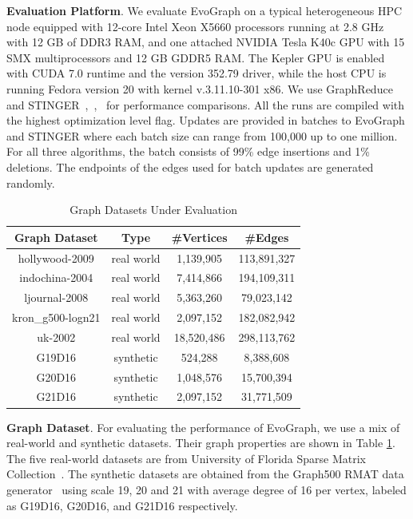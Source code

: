 \textbf{Evaluation Platform}. We evaluate EvoGraph on a typical heterogeneous HPC node equipped with 12-core Intel Xeon  X5660 processors running at 2.8 GHz with 12 GB of DDR3 RAM, and one attached NVIDIA Tesla K40c GPU with 15 SMX multiprocessors and 12 GB GDDR5 RAM. The Kepler GPU is enabled with CUDA 7.0 runtime and the version 352.79 driver, while the host CPU is running Fedora version 20 with kernel v.3.11.10-301 x86. We use GraphReduce~\cite{GraphReduce} and STINGER~\cite{stinger},~\cite{CC},~\cite{CCof} for performance comparisons. All the runs are compiled with the highest optimization level flag. Updates are provided in batches to EvoGraph and STINGER where each batch size can range from 100,000 up to one million. For all three algorithms, the batch consists of 99\% edge insertions and 1\% deletions. The endpoints of the edges used for batch updates are generated randomly.

\begin{table}[]%
\centering
\caption{Graph Datasets Under Evaluation}
\label{dataset}
\begin{tabular}{|c|c|c|c|}
\hline
Graph Dataset & Type & \#Vertices & \#Edges \\ \hline
hollywood-2009 & real world & 1,139,905 & 113,891,327 \\ \hline
indochina-2004 & real world & 7,414,866 & 194,109,311 \\ \hline
ljournal-2008 & real world & 5,363,260 & 79,023,142 \\ \hline
kron\_g500-logn21 & real world & 2,097,152 & 182,082,942 \\ \hline
uk-2002 & real world & 18,520,486 & 298,113,762 \\ \hline
G19D16 & synthetic & 524,288 & 8,388,608 \\ \hline
G20D16 & synthetic & 1,048,576 & 15,700,394 \\ \hline
G21D16 & synthetic & 2,097,152 & 31,771,509 \\ \hline
\end{tabular}
\end{table}

\textbf{Graph Dataset}. For evaluating the performance of EvoGraph, we use a mix of real-world and synthetic datasets. Their graph properties are shown in Table \ref{dataset}. The five real-world datasets are from University of Florida Sparse Matrix Collection~\cite{UFL}. The synthetic datasets are obtained from the Graph500 RMAT data generator~\cite{graph500} using scale 19, 20 and 21 with average degree of 16 per vertex, labeled as G19D16, G20D16, and G21D16 respectively.

